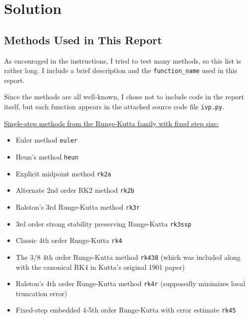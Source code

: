 \documentclass[11pt, a4paper]{article}
\begin{document}
\section{Solution}  \label{ivp:s:solution}

\subsection{Methods Used in This Report}
As encouraged in the instructions, I tried to test many methods, so this list is rather long. I include a brief description and the \texttt{function\_name} used in this report. 

Since the methods are all well-known, I chose not to include code in the report itself, but each function appears in the attached source code file \texttt{ivp.py}. 

\vspace{2mm}
\underline{Single-step methods from the Runge-Kutta family with fixed step size:}
\begin{itemize}
	\item Euler method \texttt{euler}
	
	\item Heun's method \texttt{heun}
	
	\item Explicit midpoint method \texttt{rk2a}
	
	\item Alternate 2nd order RK2 method \texttt{rk2b}
	
	\item Ralston's 3rd Runge-Kutta method \texttt{rk3r}
	
	\item 3rd order strong stability preserving Runge-Kutta  \texttt{rk3ssp}
	
	\item Classic 4th order Runge-Kutta \texttt{rk4}
	
	\item The 3/8 4th order Runge-Kutta method \texttt{rk438} (which was included along with the canonical RK4 in Kutta's original 1901 paper)
	
	\item Ralston's 4th order Runge-Kutta method \texttt{rk4r} (supposedly minimizes local truncation error)
	
	\item Fixed-step embedded 4-5th order Runge-Kutta with error estimate \texttt{rk45} 

\end{itemize}
\end{document}
